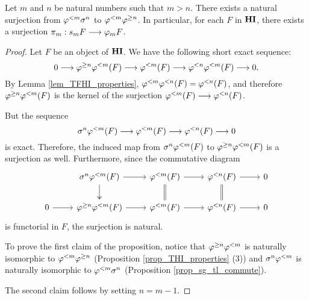 \begin{prop}\label{prop_struct_consts}
Let $m$ and $n$ be natural numbers such that $m > n$. There exists 
a natural surjection from $\varphi^{< m} \sigma^{n}$ to $\varphi^{< m} 
\varphi^{\geq n}$. In particular, for each $F$ in $\mathbf{HI}$, there exists a 
surjection $\pi_m: s_m F \longrightarrow \varphi_{m} F$.
\end{prop}
\begin{proof}
Let $F$ be an object of $\mathbf{HI}$. We have the following short exact
sequence:
\[
0 \longrightarrow \varphi^{\geq n} \varphi^{< m}(F) \longrightarrow \varphi^{< m}(F) \longrightarrow 
  \varphi^{< n} \varphi^{< m}(F) \longrightarrow 0.
\]
By Lemma \ref{lem_TFHI_properties}, $\varphi^{< m} \varphi^{< n}(F) 
= \varphi^{< n}(F)$, and therefore $\varphi^{\geq n} \varphi^{< m}(F)$ is the kernel 
of the surjection $\varphi^{< m}(F) \longrightarrow \varphi^{< n}(F)$.

But the sequence
\[
\sigma^{n} \varphi^{< m}(F) \longrightarrow \varphi^{< m}(F) \longrightarrow \varphi^{< n}(F) \longrightarrow 0
\]
is exact. Therefore, the induced map from $\sigma^{n} \varphi^{< m}(F)$
to $\varphi^{\geq n} \varphi^{< m}(F)$ is a surjection as well. Furthermore,
since the commutative diagram
\[
\begin{tikzcd}
{} & \sgHI{n} \tlHI{m}(F) \arrow{r} \arrow[twoheadrightarrow]{d} &
\tlHI{m}(F) \arrow{r} \arrow[equal]{d} &
\tlHI{n}(F) \arrow{r} \arrow[equal]{d} &
0 \\
0 \arrow{r} &
\tgHI{n} \tlHI{m}(F) \arrow{r} &
\tlHI{m}(F) \arrow{r} &
\tlHI{n}(F) \arrow{r} &
0
\end{tikzcd}
\] 
is functorial in $F$, the surjection is natural.

To prove the first claim of the proposition, notice that 
$\varphi^{\geq n} \varphi^{< m}$ is naturally isomorphic to $\varphi^{< m} \varphi^{\geq n}$ 
(Proposition \ref{prop_THI_properties} (3)) and $\sigma^{n} 
\varphi^{< m}$ is naturally isomorphic to $\varphi^{< m} \sigma^{n}$ 
(Proposition \ref{prop_sg_tl_commute}).

The second claim follows by setting $n = m - 1$.
\end{proof}
